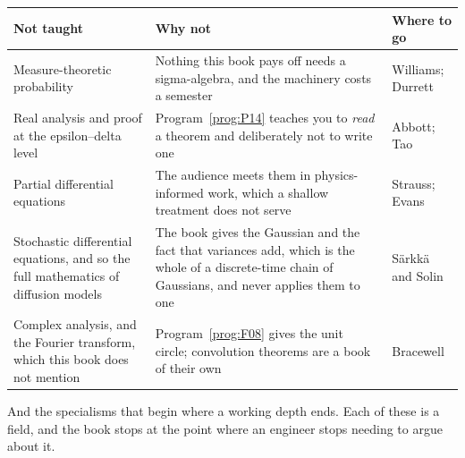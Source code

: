 \begin{center}
\begin{tabularx}{\linewidth}{@{}XXl@{}}
\toprule
\textbf{Not taught} & \textbf{Why not} & \textbf{Where to go} \\
\midrule
Measure-theoretic probability & Nothing this book pays off needs a
  sigma-algebra, and the machinery costs a semester & Williams; Durrett \\
Real analysis and proof at the epsilon--delta level & Program~\ref{prog:P14}
  teaches you to \emph{read} a theorem and deliberately not to write one & Abbott;
  Tao \\
Partial differential equations & The audience meets them in
  physics-informed work, which a shallow treatment does not serve & Strauss;
  Evans \\
Stochastic differential equations, and so the full mathematics of diffusion
  models & The book gives the Gaussian and the fact that variances add, which
  is the whole of a discrete-time chain of Gaussians, and never applies them to
  one & Särkkä and Solin \\
Complex analysis, and the Fourier transform, which this book does not mention &
  Program~\ref{prog:F08} gives the unit circle; convolution theorems are a book
  of their own & Bracewell \\
\bottomrule
\end{tabularx}
\end{center}

\medskip
And the specialisms that begin where a working depth ends. Each of these is a
field, and the book stops at the point where an engineer stops needing to
argue about it.

